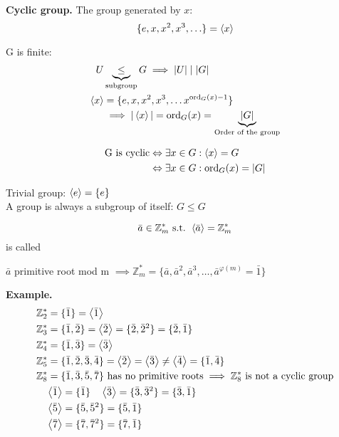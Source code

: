\textbf{Cyclic group.}
The group generated by $x$:
\[
  \{ e, x, x^2, x^3, \ldots \} = \left\langle x \right\rangle
\]

G is finite:
\begin{align*}
  U & \underbrace{\leq}_{\text{subgroup}}  G \implies |U| \mid |G|\\
      \left\langle x \right\rangle &= \{ e, x, x^2, x^3, \ldots x^{\operatorname{ord}_G(x) -1}\} \\
    & \implies |\left\langle x \right\rangle| = \operatorname{ord}_G(x) =
      \underbrace{|G|}_{\text{Order of the group}} \\
\end{align*}

\begin{align*}
  \text{G is cyclic} & \Leftrightarrow \exists x \in G: \left\langle x \right\rangle = G \\
                     & \Leftrightarrow \exists x \in G: \operatorname{ord}_G(x) = |G|
\end{align*}

Trivial group: $\left\langle e \right\rangle = \{e\}$\\
A group is always a subgroup of itself: $G \leq G$

\begin{definition}
  \[
    \bar{a} \in \mathbb{Z}_m^{*} \text{ s.t. } \left\langle \bar{a} \right\rangle = \mathbb{Z}_m^{*}
\]
is called 

$\bar{a}$ primitive root mod m
$\implies \mathbb{Z}_m^{*} = \{\bar{a}, \bar{a}^2, \bar{a}^3, \ldots, \bar{a}^{\varphi(m)} =\bar{1} \}$
\end{definition}

\textbf{Example.}
\begin{align*}
  &\mathbb{Z}_2^{*} = \{\bar{1}\} = \left\langle \bar{1} \right\rangle \\
  &\mathbb{Z}_3^{*} = \{\bar{1}, \bar{2}\} = \left\langle \bar{2} \right\rangle
    = \{\bar{2}, \bar{2}^2 \} = \{\bar{2}, \bar{1}\}\\
  &\mathbb{Z}_4^{*} = \{\bar{1}, \bar{3}\} = \left\langle \bar{3} \right\rangle \\
  &\mathbb{Z}_5^{*} = \{\bar{1}, \bar{2}, \bar{3}, \bar{4}\}
    = \left\langle \bar{2} \right\rangle = \left\langle \bar{3} \right\rangle \neq \left\langle \bar{4} \right\rangle
    = \{\bar{1}, \bar{4}\} \\
  &\mathbb{Z}_8^{*} = \{\bar{1}, \bar{3}, \bar{5}, \bar{7}\} \text{ has no primitive roots} \implies \mathbb{Z}_8^{*}\text{ is not a cyclic group} \\
  & \quad \left\langle \bar{1} \right\rangle = \{\bar{1}\} \quad \left\langle \bar{3} \right\rangle=\{\bar{3}, \bar{3}^2\}=\{\bar{3}, \bar{1}\} \\
  & \quad \left\langle \bar{5} \right\rangle=\{\bar{5}, \bar{5}^2\}=\{\bar{5}, \bar{1}\} \\
  & \quad \left\langle \bar{7} \right\rangle=\{\bar{7}, \bar{7}^2\}=\{\bar{7}, \bar{1}\} \\
\end{align*}

